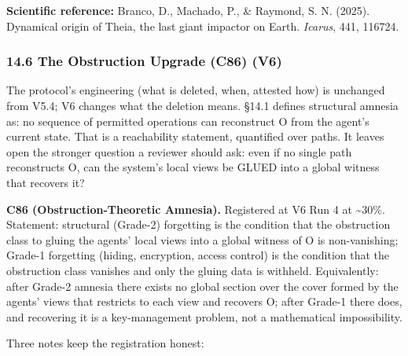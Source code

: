 \documentclass[
]{article}
\begin{document}
\textbf{Scientific reference:} Branco, D., Machado, P., \& Raymond, S.
N. (2025). Dynamical origin of Theia, the last giant impactor on Earth.
\emph{Icarus}, 441, 116724.

\subsubsection{14.6 The Obstruction Upgrade (C86)
(V6)}\label{the-obstruction-upgrade-c86-v6}

The protocol's engineering (what is deleted, when, attested how) is
unchanged from V5.4; V6 changes what the deletion means. §14.1 defines
structural amnesia as: no sequence of permitted operations can
reconstruct O from the agent's current state. That is a reachability
statement, quantified over paths. It leaves open the stronger question a
reviewer should ask: even if no single path reconstructs O, can the
system's local views be GLUED into a global witness that recovers it?

\textbf{C86 (Obstruction-Theoretic Amnesia).} Registered at V6 Run 4 at
\textasciitilde30\%. Statement: structural (Grade-2) forgetting is the
condition that the obstruction class to gluing the agents' local views
into a global witness of O is non-vanishing; Grade-1 forgetting (hiding,
encryption, access control) is the condition that the obstruction class
vanishes and only the gluing data is withheld. Equivalently: after
Grade-2 amnesia there exists no global section over the cover formed by
the agents' views that restricts to each view and recovers O; after
Grade-1 there does, and recovering it is a key-management problem, not a
mathematical impossibility.

Three notes keep the registration honest:
\end{document}
